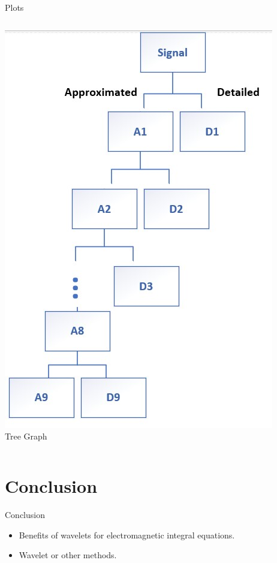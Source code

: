 \documentclass{beamer}
\begin{document}
\begin{frame}{Plots}
\begin{columns}[T]
        \includegraphics[width=\textwidth, height=0.6\textheight]{Tree graph.jpg} \\[0.2cm] %
        {\scriptsize Tree Graph} %
        
    \end{columns}

\end{frame}

\section{Conclusion}
\begin{frame}{Conclusion}
    \begin{itemize}
        \vspace*{-\baselineskip}
        \item Benefits of wavelets for electromagnetic integral equations.
        \item Wavelet or other methods.
    \end{itemize}
\end{frame}
\end{document}
